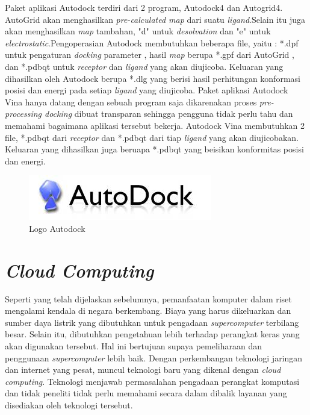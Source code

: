 Paket aplikasi Autodock terdiri dari 2 program, Autodock4 dan Autogrid4. AutoGrid akan menghasilkan \textit{pre-calculated map} dari suatu \textit{ligand}.Selain itu juga akan menghasilkan \textit{map} tambahan, "d" untuk \textit{desolvation} dan "e" untuk \textit{electrostatic}.Pengoperasian Autodock membutuhkan beberapa file, yaitu : *.dpf untuk pengaturan \textit{docking} parameter , hasil \textit{map} berupa *.gpf dari AutoGrid , dan *.pdbqt untuk \textit{receptor} dan \textit{ligand} yang akan diujicoba. Keluaran yang dihasilkan oleh Autodock berupa *.dlg yang berisi hasil perhitungan konformasi posisi dan energi pada setiap \textit{ligand} yang diujicoba. Paket aplikasi Autodock Vina hanya datang dengan sebuah program saja dikarenakan proses \textit{pre-processing docking} dibuat transparan sehingga pengguna tidak perlu tahu dan memahami bagaimana aplikasi tersebut bekerja. Autodock Vina membutuhkan 2 file, *.pdbqt dari \textit{receptor} dan *.pdbqt dari tiap \textit{ligand} yang akan diujicobakan. Keluaran yang dihasilkan juga beruapa *.pdbqt yang beisikan konformitas posisi dan energi.
\begin{figure}
	\centering
	\includegraphics{autodock.jpg}
	\caption{Logo Autodock}
\end{figure}

\section{\textit{Cloud Computing}}
\hspace{0.5 cm}Seperti yang telah dijelaskan sebelumnya, pemanfaatan komputer dalam riset mengalami kendala di negara berkembang. Biaya yang harus dikeluarkan dan sumber daya listrik yang dibutuhkan untuk pengadaan \textit{supercomputer} terbilang besar. Selain itu, dibutuhkan pengetahuan lebih terhadap perangkat keras yang akan digunakan tersebut. Hal ini bertujuan supaya pemeliharaan dan penggunaan \textit{supercomputer} lebih baik. Dengan perkembangan teknologi jaringan dan internet yang pesat, muncul teknologi baru yang dikenal dengan \textit{cloud computing}. Teknologi menjawab permasalahan pengadaan perangkat komputasi dan tidak peneliti tidak perlu memahami secara dalam dibalik layanan yang disediakan oleh teknologi tersebut.


